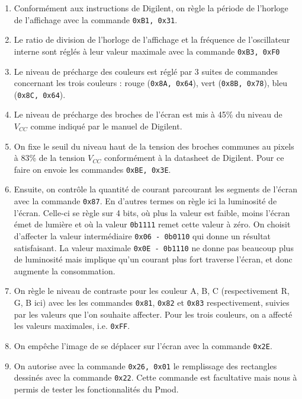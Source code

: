 \documentclass[11pt]{article}
\begin{document}
\begin{enumerate}
    \item Conformément aux instructions de Digilent, on règle la période de l'horloge de l'affichage avec la commande \texttt{0xB1, 0x31}. 

    \item Le ratio de division de l'horloge de l'affichage et la fréquence de l'oscillateur interne sont réglés à leur valeur maximale avec la commande \texttt{0xB3, 0xF0}

    \item Le niveau de précharge des couleurs est réglé par 3 suites de commandes concernant les trois couleurs : rouge (\texttt{0x8A, 0x64}), vert (\texttt{0x8B, 0x78}), bleu (\texttt{0x8C, 0x64}). 

    \item Le niveau de précharge des broches de l'écran est mis à 45\% du niveau de $V_{CC}$ comme indiqué par le manuel de Digilent. 

    \item On fixe le seuil du niveau haut de la tension des broches communes au pixels à 83\% de la tension $V_{CC}$ conformément à la datasheet de Digilent. Pour ce faire on envoie les commandes \texttt{0xBE, 0x3E}. 

    \item Ensuite, on contrôle la quantité de courant parcourant les segments de l'écran avec la commande \texttt{0x87}. En d'autres termes on règle ici la luminosité de l'écran. Celle-ci se règle sur 4 bits, où plus la valeur est faible, moins l'écran émet de lumière et où la valeur \texttt{0b1111} remet cette valeur à zéro. On choisit d'affecter la valeur intermédiaire \texttt{0x06 - 0b0110} qui donne un résultat satisfaisant. La valeur maximale \texttt{0x0E - 0b1110} ne donne pas beaucoup plus de luminosité mais implique qu'un courant plus fort traverse l'écran, et donc augmente la consommation. 

    \item On règle le niveau de contraste pour les couleur A, B, C (respectivement R, G, B ici) avec les les commandes \texttt{0x81}, \texttt{0x82} et \texttt{0x83} respectivement, suivies par les valeurs que l'on souhaite affecter. Pour les trois couleurs, on a affecté les valeurs maximales, i.e. \texttt{0xFF}. 

    \item On empêche l'image de se déplacer sur l'écran avec la commande \texttt{0x2E}.

    \item On autorise avec la commande \texttt{0x26, 0x01} le remplissage des rectangles dessinés avec la commande \texttt{0x22}. Cette commande est facultative mais nous à permis de tester les fonctionnalités du Pmod. 


\end{enumerate}
\end{document}
